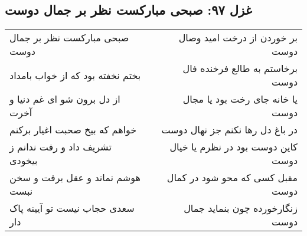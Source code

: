 \begin{center}
\section*{غزل ۹۷: صبحی مبارکست نظر بر جمال دوست}
\label{sec:097}
\begin{longtable}{l p{0.5cm} r}
صبحی مبارکست نظر بر جمال دوست
&&
بر خوردن از درخت امید وصال دوست
\\
بختم نخفته بود که از خواب بامداد
&&
برخاستم به طالع فرخنده فال دوست
\\
از دل برون شو ای غم دنیا و آخرت
&&
یا خانه جای رخت بود یا مجال دوست
\\
خواهم که بیخ صحبت اغیار برکنم
&&
در باغ دل رها نکنم جز نهال دوست
\\
تشریف داد و رفت ندانم ز بیخودی
&&
کاین دوست بود در نظرم یا خیال دوست
\\
هوشم نماند و عقل برفت و سخن نبست
&&
مقبل کسی که محو شود در کمال دوست
\\
سعدی حجاب نیست تو آیینه پاک دار
&&
زنگارخورده چون بنماید جمال دوست
\\
\end{longtable}
\end{center}
